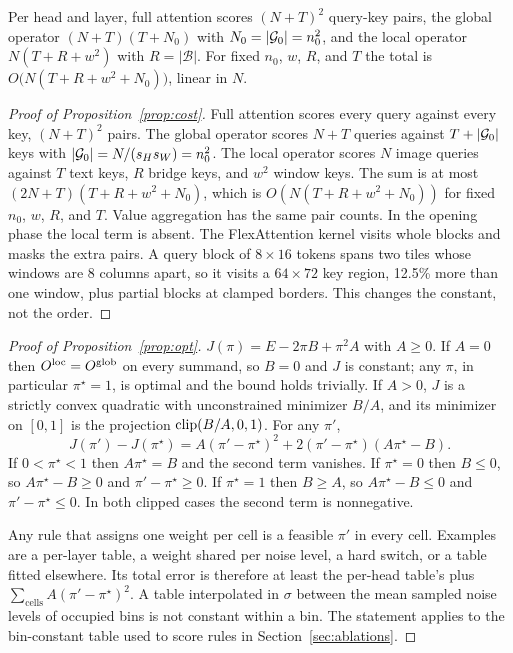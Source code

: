 \begin{proposition}[Cost]
\label{prop:cost}
Per head and layer, full attention scores $(N+T)^2$ query-key pairs, the global operator $(N+T)(T+N_0)$ with $N_0=|\mathcal{G}_{0}|=n_0^2$, and the local operator $N(T+R+w^2)$ with $R=|\mathcal{B}|$. For fixed $n_0$, $w$, $R$, and $T$ the total is $O\big(N(T+R+w^2+N_0)\big)$, linear in $N$.
\end{proposition}
\begin{proof}[Proof of Proposition~\ref{prop:cost}]
Full attention scores every query against every key, $(N+T)^2$ pairs. The global operator scores $N+T$ queries against $T+|\mathcal{G}_{0}|$ keys with $|\mathcal{G}_{0}|=N/(s_Hs_W)=n_0^2$. The local operator scores $N$ image queries against $T$ text keys, $R$ bridge keys, and $w^2$ window keys. The sum is at most $(2N+T)(T+R+w^2+N_0)$, which is $O(N(T+R+w^2+N_0))$ for fixed $n_0$, $w$, $R$, and $T$. Value aggregation has the same pair counts. In the opening phase the local term is absent. The FlexAttention kernel visits whole blocks and masks the extra pairs. A query block of $8\times16$ tokens spans two tiles whose windows are 8 columns apart, so it visits a $64\times72$ key region, 12.5\% more than one window, plus partial blocks at clamped borders. This changes the constant, not the order.
\end{proof}

\begin{proof}[Proof of Proposition~\ref{prop:opt}]
$J(\pi)=E-2\pi B+\pi^2A$ with $A\ge0$. If $A=0$ then $O^{\mathrm{loc}}=O^{\mathrm{glob}}$ on every summand, so $B=0$ and $J$ is constant; any $\pi$, in particular $\pi^\star=1$, is optimal and the bound holds trivially. If $A>0$, $J$ is a strictly convex quadratic with unconstrained minimizer $B/A$, and its minimizer on $[0,1]$ is the projection $\operatorname{clip}(B/A,0,1)$. For any $\pi'$,
\[
J(\pi')-J(\pi^\star)=A(\pi'-\pi^\star)^2+2(\pi'-\pi^\star)(A\pi^\star-B).
\]
If $0<\pi^\star<1$ then $A\pi^\star=B$ and the second term vanishes. If $\pi^\star=0$ then $B\le0$, so $A\pi^\star-B\ge0$ and $\pi'-\pi^\star\ge0$. If $\pi^\star=1$ then $B\ge A$, so $A\pi^\star-B\le0$ and $\pi'-\pi^\star\le0$. In both clipped cases the second term is nonnegative.

Any rule that assigns one weight per cell is a feasible $\pi'$ in every cell. Examples are a per-layer table, a weight shared per noise level, a hard switch, or a table fitted elsewhere. Its total error is therefore at least the per-head table's plus $\sum_{\text{cells}}A(\pi'-\pi^\star)^2$. A table interpolated in $\sigma$ between the mean sampled noise levels of occupied bins is not constant within a bin. The statement applies to the bin-constant table used to score rules in Section~\ref{sec:ablations}.
\end{proof}

